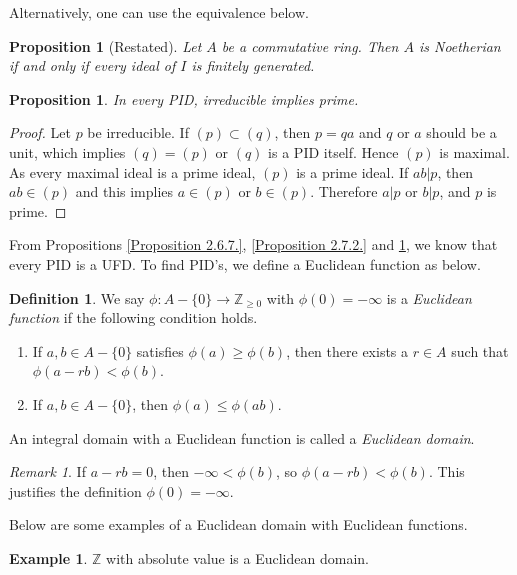\documentclass[12pt]{report}
\theoremstyle{plain}
\newtheorem{proposition}[theorem]{Proposition}
\theoremstyle{remark}
\newtheorem*{remark}{Remark}
\theoremstyle{definition}
\newtheorem{definition}[theorem]{Definition}
\newtheorem{example}[theorem]{Example}
\newcommand{\Z}{\mathbb{Z}}
\begin{document}
Alternatively, one can use the equivalence below.

\begin{proposition}[Restated]
    Let $A$ be a commutative ring. Then $A$ is Noetherian if and only if every ideal of $I$ is finitely generated.
\end{proposition}

\begin{proposition}\label{Proposition 2.7.4.}
    In every PID, irreducible implies prime.
\end{proposition}
\begin{proof}
    Let $p$ be irreducible. If $(p)\subset (q)$, then $p=qa$ and $q$ or $a$ should be a unit, which implies $(q)=(p)$ or $(q)$ is a PID itself. Hence $(p)$ is maximal. As every maximal ideal is a prime ideal, $(p)$ is a prime ideal. If $ab|p$, then $ab\in (p)$ and this implies $a\in (p)$ or $b\in(p)$. Therefore $a|p$ or $b|p$, and $p$ is prime.
\end{proof}

From Propositions \ref{Proposition 2.6.7.}, \ref{Proposition 2.7.2.} and \ref{Proposition 2.7.4.}, we know that every PID is a UFD. To find PID's, we define a Euclidean function as below.

\begin{definition}
    We say $\phi:A-\{0\}\rightarrow\Z_{\ge 0}$ with $\phi(0)=-\infty$ is a \emph{Euclidean function} if the following condition holds.
    \begin{enumerate}
        \item If $a,b\in A-\{0\}$ satisfies $\phi(a)\ge \phi(b)$, then there exists a $r\in A$ such that $\phi(a-rb)<\phi(b)$.
        \item If $a,b\in A-\{0\}$, then $\phi(a)\le \phi(ab)$.
    \end{enumerate}
    An integral domain with a Euclidean function is called a \emph{Euclidean domain}.
\end{definition}
\begin{remark}
    If $a-rb = 0$, then $-\infty < \phi(b)$, so $\phi(a-rb)<\phi(b)$. This justifies the definition $\phi(0)=-\infty$.
\end{remark}

Below are some examples of a Euclidean domain with Euclidean functions.

\begin{example}
    $\Z$ with absolute value is a Euclidean domain.
\end{example}
\end{document}
